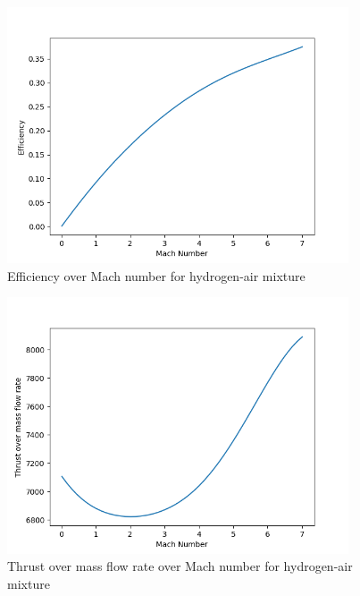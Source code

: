 \documentclass[a4paper,11pt]{article}
\begin{document}
	\begin{figure}[H]
		\centering
		\includegraphics[width=0.9\textwidth]{H2_pow(1mol)/Efficiency_over_Mach.png}
       		\caption{Efficiency over Mach number for hydrogen-air mixture}
	\end{figure}
	\begin{figure}[H]
		\centering
		\includegraphics[width=0.9\textwidth]{H2_pow(1mol)/Thrust_over_mass_flow_rate_over_Mach.png}
       		\caption{Thrust over mass flow rate over Mach number for hydrogen-air mixture}
	\end{figure}
\end{document}
